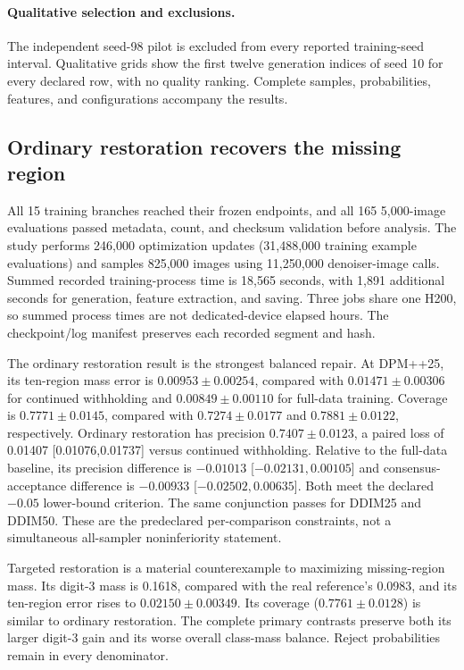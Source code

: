 \paragraph{Qualitative selection and exclusions.}
The independent seed-98 pilot is excluded from every reported training-seed
interval. Qualitative grids show the first twelve generation indices of seed
10 for every declared row, with no quality ranking. Complete samples,
probabilities, features, and configurations accompany the results.

\subsection{Ordinary restoration recovers the missing region}
All 15 training branches reached their frozen endpoints, and all 165
5,000-image evaluations passed metadata, count, and checksum validation before
analysis. The study performs 246,000 optimization updates (31,488,000 training
example evaluations) and samples 825,000 images using 11,250,000 denoiser-image
calls. Summed recorded training-process time is 18,565 seconds, with 1,891
additional seconds for generation, feature extraction, and saving. Three jobs
share one H200, so summed process times are not dedicated-device elapsed hours.
The checkpoint/log manifest preserves each recorded segment and hash.

The ordinary restoration result is the strongest balanced repair. At DPM++25,
its ten-region mass error is $0.00953\pm0.00254$, compared with
$0.01471\pm0.00306$ for continued withholding and $0.00849\pm0.00110$ for
full-data training. Coverage is $0.7771\pm0.0145$, compared with
$0.7274\pm0.0177$ and $0.7881\pm0.0122$, respectively. Ordinary restoration
has precision $0.7407\pm0.0123$, a paired loss of 0.01407
[0.01076,0.01737] versus continued withholding. Relative to the full-data
baseline, its precision difference is $-0.01013$ [$-0.02131,0.00105$]
and consensus-acceptance difference is $-0.00933$ [$-0.02502,0.00635$].
Both meet the declared $-0.05$ lower-bound criterion. The same conjunction
passes for DDIM25 and DDIM50. These are the predeclared per-comparison
constraints, not a simultaneous all-sampler noninferiority statement.

Targeted restoration is a material counterexample to maximizing missing-region
mass. Its digit-3 mass is 0.1618, compared with the real reference's 0.0983,
and its ten-region error rises to $0.02150\pm0.00349$. Its coverage
($0.7761\pm0.0128$) is similar to ordinary restoration. The complete primary
contrasts preserve both its larger digit-3 gain and its worse overall class-mass
balance. Reject probabilities remain in every denominator.

